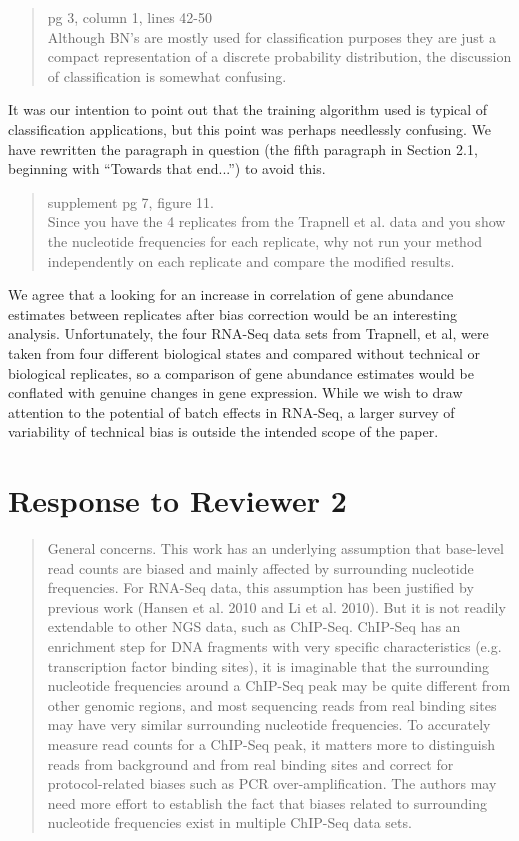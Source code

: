 \documentclass{article}
\begin{document}
\begin{quote}
pg 3, column 1, lines 42-50 \\
Although BN's are mostly used for classification purposes they are just a
compact representation of a discrete probability distribution, the discussion
of classification is somewhat confusing.
\end{quote}

It was our intention to point out that the training algorithm used is typical of
classification applications, but this point was perhaps needlessly confusing.
We have rewritten the paragraph in question (the fifth paragraph in Section 2.1,
beginning with ``Towards that end...'') to avoid this.


\begin{quote}
supplement pg 7, figure 11. \\
Since you have the 4 replicates from the Trapnell et al. data and you show the
nucleotide frequencies for each replicate, why not run your method independently
on each replicate and compare the modified results.
\end{quote}

We agree that a looking for an increase in correlation of gene abundance
estimates between replicates after bias correction would be an interesting
analysis. Unfortunately, the four RNA-Seq data sets from Trapnell, et al, were
taken from four different biological states and compared without technical or
biological replicates, so a comparison of gene abundance estimates would be
conflated with genuine changes in gene expression.  While we wish to draw
attention to the potential of batch effects in RNA-Seq, a larger survey of
variability of technical bias is outside the intended scope of the paper.


\section*{Response to Reviewer 2}

\begin{quote}
General concerns. This work has an underlying assumption that base-level read
counts are biased and mainly affected by surrounding nucleotide frequencies.
For RNA-Seq data, this assumption has been justified by previous work (Hansen et
al. 2010 and Li et al. 2010). But it is not readily extendable to other NGS
data, such as ChIP-Seq. ChIP-Seq has an enrichment step for DNA fragments with
very specific characteristics (e.g. transcription factor binding sites), it is
imaginable that the surrounding nucleotide frequencies around a ChIP-Seq peak
may be quite different from other genomic regions, and most sequencing reads
from real binding sites may have very similar surrounding nucleotide
frequencies. To accurately measure read counts for a ChIP-Seq peak, it matters
more to distinguish reads from background and from real binding sites and
correct for protocol-related biases such as PCR over-amplification. The authors
may need more effort to establish the fact that biases related to surrounding
nucleotide frequencies exist in multiple ChIP-Seq data sets.
\end{quote}
\end{document}
